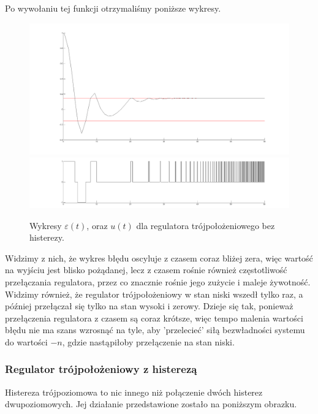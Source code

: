 \documentclass[a4paper,10pt]{article}
\begin{document}
Po wywołaniu tej funkcji otrzymaliśmy poniższe wykresy.

\begin{figure}[!h]
    \centering
	\includegraphics[width=120mm]{CW3-trojpolozeniowy-e-n015-a0.png}
	\includegraphics[width=120mm]{CW3-trojpolozeniowy-u-n015-a0.png}
	\caption{Wykresy $\varepsilon(t)$, oraz $u(t)$ dla regulatora trójpołożeniowego bez histerezy.}
    \label{fig:Rysunek}
\end{figure}

\newpage Widzimy z nich, że wykres błędu oscyluje z czasem coraz bliżej zera, więc wartość na wyjściu jest blisko pożądanej, lecz z czasem rośnie również częstotliwość przełączania regulatora, przez co znacznie rośnie jego zużycie i maleje żywotność. \\
Widzimy również, że regulator trójpołożeniowy w stan niski wszedł tylko raz, a później przełączał się tylko na stan wysoki i zerowy. Dzieje się tak, ponieważ przełączenia regulatora z czasem są coraz krótsze, więc tempo malenia wartości błędu nie ma szans wzrosnąć na tyle, aby 'przelecieć' siłą bezwładności systemu do wartości $-n$, gdzie nastąpiłoby przełączenie na stan niski. 

\subsubsection{Regulator trójpołożeniowy z histerezą}\label{sec:r3h}

Histereza trójpoziomowa to nic innego niż połączenie dwóch histerez dwupoziomowych. Jej działanie przedstawione zostało na poniższym obrazku.
\end{document}
